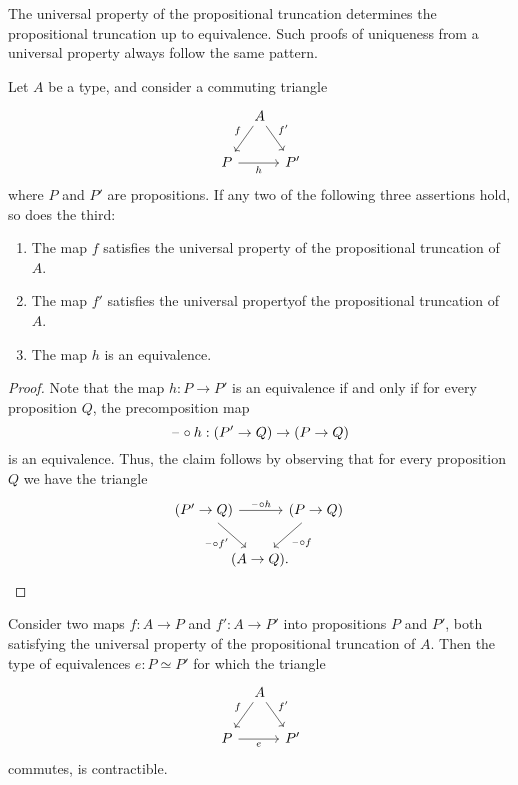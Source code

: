 The universal property of the propositional truncation determines the propositional truncation up to equivalence. Such proofs of uniqueness from a universal property always follow the same pattern.

\begin{prp}\label{prp:propositional-truncation-3-for-2}
  Let $A$ be a type, and consider a commuting triangle
  \begin{equation*}
    \begin{tikzcd}[column sep=tiny]
      \phantom{P'} & A \arrow[dl,swap,"f"] \arrow[dr,"{f'}"] \\
      P \arrow[rr,swap,"h"] & & P'
    \end{tikzcd}
  \end{equation*}
  where $P$ and $P'$ are propositions. If any two of the following three assertions hold, so does the third:
  \begin{enumerate}
  \item The map $f$ satisfies the universal property of the propositional truncation of $A$.
  \item The map $f'$ satisfies the universal propertyof the propositional truncation of $A$.
  \item The map $h$ is an equivalence.
  \end{enumerate}
\end{prp}

\begin{proof}
  Note that the map $h:P\to P'$ is an equivalence if and only if for every proposition $Q$, the precomposition map
  \begin{equation*}
    \mathord{\hspace{1pt}\text{--}\hspace{1pt}}\circ h:(P'\to Q)\to (P\to Q)
  \end{equation*}
  is an equivalence. Thus, the claim follows by observing that for every proposition $Q$ we have the triangle
  \begin{equation*}
    \begin{tikzcd}[column sep=-1em]
      (P'\to Q) \arrow[rr,"\blank\circ h"] \arrow[dr,swap,"\blank\circ {f'}"] & & (P\to Q) \arrow[dl,"\blank\circ f"] \\
      & (A\to Q). & \phantom{(P'\to Q)}
    \end{tikzcd}
  \end{equation*}
\end{proof}

\begin{cor}\label{cor:uniquely-unique-brck}
  Consider two maps $f:A\to P$ and $f':A\to P'$ into propositions $P$ and $P'$, both satisfying the universal property of the propositional truncation of $A$. Then the type of equivalences $e:P \simeq P'$ for which the triangle
  \begin{equation*}
    \begin{tikzcd}[column sep=tiny]
      \phantom{P'} & A \arrow[dl,swap,"f"] \arrow[dr,"{f'}"] \\
      P \arrow[rr,swap,"e"] & & P'
    \end{tikzcd}
  \end{equation*}
  commutes, is contractible.
\end{cor}

